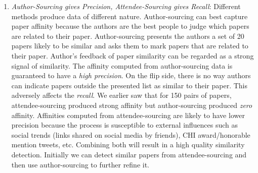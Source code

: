 \documentclass[letterpaper]{article}
\begin{document}
\begin{enumerate}
\item \emph{Author-Sourcing gives Precision, Attendee-Sourcing gives Recall}: Different methods produce data of different nature. Author-sourcing can best capture paper affinity because the authors are the best people to judge which papers are related to their paper.  Author-sourcing presents the authors a set of 20 papers likely to be similar and asks them to mark papers that are related to their paper. Author's feedback of paper similarity can be regarded as a strong signal of similarity. The affinity computed from author-sourcing data is guaranteed to have a \emph{high precision}. On the flip side, there is no way authors can indicate papers outside the presented list as similar to their paper. This adversely affects the \emph{recall}. We earlier saw that for 150 pairs of papers, attendee-sourcing produced strong affinity but author-sourcing produced \emph{zero} affinity. Affinities computed from attendee-sourcing are likely to have lower precision because the process is susceptible to external influences such as social trends (links shared on social media by friends), CHI award/honorable mention tweets, etc. Combining both will result in a high quality similarity detection. Initially we can detect similar papers from attendee-sourcing and then use author-sourcing to further refine it.
 \end {enumerate}
\end{document}

